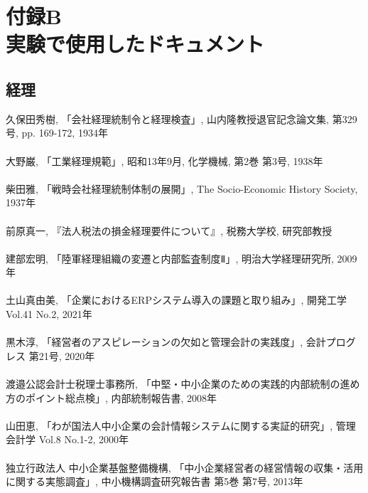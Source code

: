 \chapter*{付録B\\実験で使用したドキュメント}

\setlength{\parindent}{0pt}

\section*{経理}
久保田秀樹, 「会社経理統制令と経理検査」, 山内隆教授退官記念論文集, 第329号, pp. 169-172, 1934年
\\\\
大野巌, 「工業経理規範」, 昭和13年9月, 化学機械, 第2巻 第3号, 1938年
\\\\
柴田雅, 「戦時会社経理統制体制の展開」, The Socio-Economic History Society, 1937年
\\\\
前原真一, 『法人税法の損金経理要件について』, 税務大学校, 研究部教授
\\\\
建部宏明, 「陸軍経理組織の変遷と内部監査制度Ⅱ」, 明治大学経理研究所, 2009年
\\\\
土山真由美, 「企業におけるERPシステム導入の課題と取り組み」, 開発工学 Vol.41 No.2, 2021年
\\\\
黒木淳, 「経営者のアスピレーションの欠如と管理会計の実践度」, 会計プログレス 第21号, 2020年
\\\\
渡邉公認会計士税理士事務所, 「中堅・中小企業のための実践的内部統制の進め方のポイント総点検」, 内部統制報告書, 2008年
\\\\
山田恵, 「わが国法人中小企業の会計情報システムに関する実証的研究」, 管理会計学 Vol.8 No.1-2, 2000年
\\\\
独立行政法人 中小企業基盤整備機構, 「中小企業経営者の経営情報の収集・活用に関する実態調査」, 中小機構調査研究報告書 第5巻 第7号, 2013年

\clearpage
